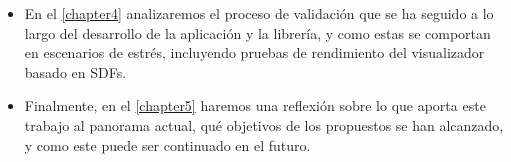 \begin{itemize}
    \item En el \autoref{chapter4} analizaremos el proceso de validación que se ha seguido a lo largo del desarrollo de la aplicación y la librería, y como estas se comportan en escenarios de estrés, incluyendo pruebas de rendimiento del visualizador basado en SDFs.
    
    \item Finalmente, en el \autoref{chapter5} haremos una reflexión sobre lo que aporta este trabajo al panorama actual, qué objetivos de los propuestos se han alcanzado, y como este puede ser continuado en el futuro.
\end{itemize}

\endinput
